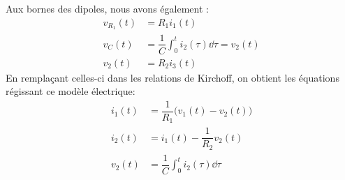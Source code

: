 Aux bornes des dipoles, nous avons également :
\begin{align*}
    v_{R_1}(t)&=R_1i_1(t)\\
    v_{C}(t)&=\dfrac{1}{C}\int_0^t i_2(\tau) \dd{\tau}=v_2(t)\\
    v_2(t)&=R_2i_3(t)
\end{align*}
En remplaçant celles-ci dans les relations de Kirchoff, on obtient les 
équations régissant ce modèle électrique:
\begin{align*}
    i_1(t)&=\dfrac{1}{R_1}\big(v_1(t)-v_2(t)\big)\\
    i_2(t)&=i_1(t)-\dfrac{1}{R_2}v_2(t)\\
    v_2(t)&=\dfrac{1}{C}\int_0^t i_2(\tau) \dd{\tau}
\end{align*}
